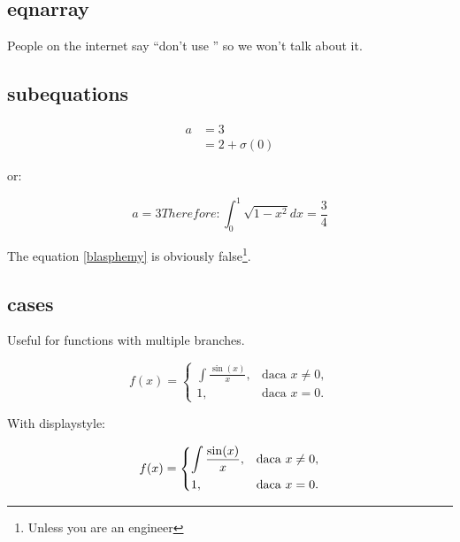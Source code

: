 \subsection{eqnarray}
People on the internet say ``don't use '' so we won't talk about it.

\subsection{subequations}
\begin{example}
\begin{subequations}
\begin{align}
  a &= 3\\
  &= 2 + \sigma(0)
\end{align}
\end{subequations}
\end{example}

or:

\begin{example}
\begin{subequations}
\begin{equation}
  a = 3\label{blasphemy}
\end{equation}
Therefore:
\begin{equation}
  \int_0^1\sqrt{1-x^2} dx = \frac{3}{4}
\end{equation}
\end{subequations}

The equation \eqref{blasphemy} %
is obviously false\footnote{
  Unless you are an engineer}.
\end{example}


\subsection{cases}
Useful for functions with multiple branches.

\begin{example}
\[f(x) =
\begin{cases}
  \int\frac{\sin(x)}{x},&\text{daca } x \neq 0,\\
  1,&\text{daca } x=0.
\end{cases}
\]
\end{example}

With displaystyle:\\
\begin{example}
\[f(x) =
\begin{dcases}
  \int\frac{\sin(x)}{x},&\text{daca } x \neq 0,\\
  1,&\text{daca } x=0.
\end{dcases}
\]
\end{example}

